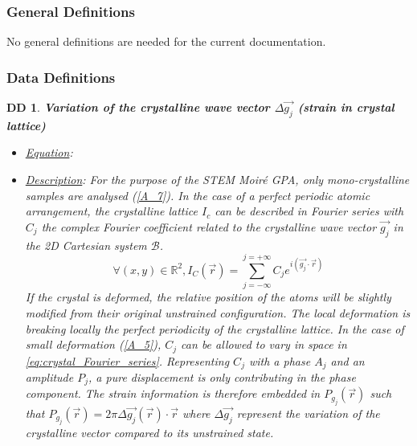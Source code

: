 \documentclass[12pt]{article}
\newtheorem{DD}{DD}
\begin{document}
\subsubsection{General Definitions}\label{sec_gendef}

No general definitions are needed for the current documentation.

\subsubsection{Data Definitions}\label{sec_datadef}

\renewcommand{\labelitemi}{$\star$}

\begin{DD}
\label{DD_1}
\noindent\colorbox{shadecolorDD}{\normalfont \textbf{Variation of the crystalline wave vector $\Delta \overrightarrow{g_j}$ (strain in crystal lattice)}}
\normalfont
\begin{itemize}
\item \underline{Equation}: 
\item \underline{Description}: For the purpose of the STEM Moir{\'e} GPA, only mono-crystalline samples are analysed (\cref{A_7}). In the case of a perfect periodic atomic arrangement, the crystalline lattice $I_c$ can be described in Fourier series with $C_j$ the complex Fourier coefficient related to the crystalline wave vector $\vec{g_j}$ in the 2D Cartesian system $\mathcal{B}$.
\begin{equation}
\forall (x,y) \in \mathbb{R}^{2},I_C(\vec{r})=\sum_{j=-\infty}^{j=+\infty}C_je^{i(\vec{g_j}\cdot\vec{r})}
\label{eq:crystal_Fourier_series}
\end{equation}
If the crystal is deformed, the relative position of the atoms will be slightly modified from their original unstrained configuration. The local deformation is breaking locally the perfect periodicity of the crystalline lattice. In the case of small deformation (\cref{A_5}), $C_j$ can be allowed to vary in space in \cref{eq:crystal_Fourier_series}. Representing $C_j$ with a phase $A_j$ and an amplitude $P_j$, a pure displacement is only contributing in the phase component. The strain information is therefore embedded in $P_{g_{j}}(\vec{r})$ such that $P_{g_{j}}(\vec{r})=2\pi\Delta \overrightarrow{g_{j}}(\vec{r})\cdot\vec{r}$ where $\Delta \overrightarrow{g_j}$ represent the variation of the crystalline vector compared to its unstrained state.
\begin{equation}
\begin{gathered}

\end{gathered}
\end{equation}
\end{itemize}
\end{DD}
\end{document}
